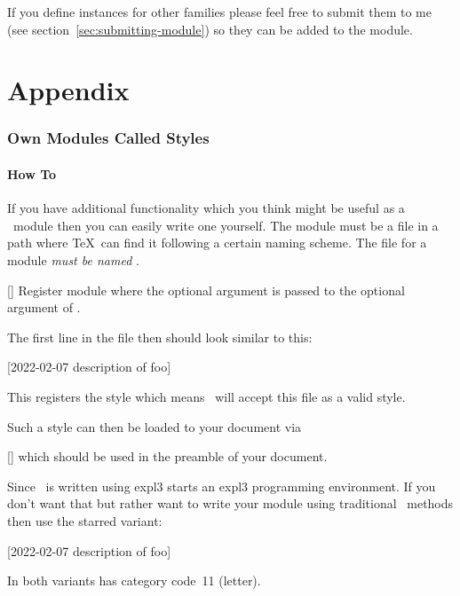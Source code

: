 \documentclass{chemmacros-manual}
\begin{document}
If you define instances for other families please feel free to submit them to
me (see section~\vref{sec:submitting-module}) so they can be added to the
 module.

\appendix
\part{Appendix}
\section{Own Modules Called Styles}\label{sec:own-modules}
\subsection{How To}

If you have additional functionality which you think might be useful as a
\chemmacros\ module then you can easily write one yourself.  The module must
be a file in a path where \TeX\ can find it following a certain naming
scheme.  The file for a module  \emph{must be named}
.

\begin{commands}
  [\sarg{}]
    Register module  where the optional argument is passed to the
    optional argument of .
\end{commands}

The first line in the file then should look similar to this:
\begin{sourcecode}
  [2022-02-07 description of foo]
\end{sourcecode}
This registers the style  which means \chemmacros\ will
accept this file as a valid style.

Such a style can then be loaded to your document via
\begin{commands}
  []
    which should be used in the preamble of your document.
\end{commands}

Since \chemmacros\ is written using expl3  starts an expl3
programming environment.  If you don't want that but rather want to write your
module using traditional \LaTeXe\ methods then use the starred variant:
\begin{sourcecode}
  [2022-02-07 description of foo]
\end{sourcecode}
In both variants  has category code~11 (letter).
\end{document}
